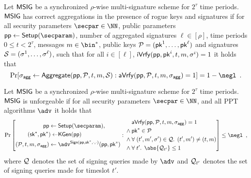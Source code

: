 \begin{definition}
  Let $\mathsf{MSIG}$ be a synchronized $\rho$-wise multi-signature scheme for $2^\tau$ time periods.
  $\mathsf{MSIG}$ has correct aggregations in the presence of rogue keys and signatures if for all security parameters $\secpar\in\NN$, public parameters $\params\gets\setup(\secparam)$, number of aggregated signatures $\ell\in[\rho]$, time periods $0\leq t< 2^\tau$, messages $m\in\bin^*$, public keys $\mathcal{P} = (\mathsf{pk}^1,\dots,\mathsf{pk}^\ell)$ and signatures $\mathcal{S} = (\sigma^1,\dots,\sigma^\ell)$, such that for all $i\in[\ell]$, $\mathsf{iVrfy}(\mathsf{pp},\mathsf{pk}^i,t,m,\sigma^i) = 1$ it holds that
  \[
    \Pr[\aggsig\gets\aggregate(\params,\pubkeys,t,m,\signatures): \averify(\params,\pubkeys,t,m,\aggsig)=1]=1-\negl\enspace.
  \]
\end{definition}

\begin{definition}[Unforgeability]\label{def:multisigunforge}
  Let $\mathsf{MSIG}$ be a synchronized $\rho$-wise multi-signature scheme for $2^\tau$ time periods.
  $\mathsf{MSIG}$ is unforgeable if for all security parameters $\secpar\in\NN$, and all PPT algorithms $\adv$ it holds that
\[
  \Pr\left[\begin{aligned}\params\gets{}&\setup(\secparam),\\ (\sk^*,\pk^*)\gets&\kgen(\params)\\(\pubkeys,t,m,\aggsig)\gets{}&\adv^{\sign(\params,\sk^*,\cdot,\cdot)}(\params,\pk^*)\end{aligned}: 
  \begin{aligned}
  &\averify(\params,\pubkeys,t,m,\aggsig)=1\\
  {}\land{}&\pk^*\in\pubkeys\\
  {}\land{}&\forall\; (t',m',\sigma') \in\queries\ldotp\; (t',m') \neq (t,m)\\
  {}\land{}&\forall\; t' \ldotp\;\abs{\queries_{t'}}\leq 1
  \end{aligned}\right] \leq \negl\enspace,
\]
where $\mathcal{Q}$ denotes the set of signing queries made by $\adv$ and $\mathcal{Q}_{t'}$ denotes the set of signing queries made for timeslot $t'$.
\end{definition}

